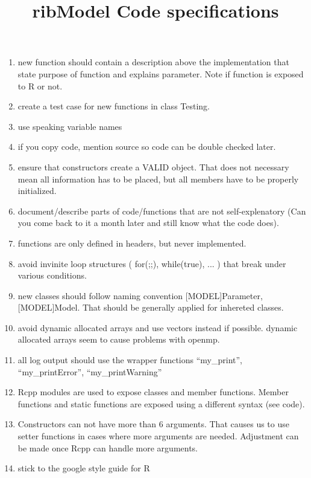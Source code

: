 \documentclass[letter,10pt]{article}
\title{ribModel Code specifications}
\begin{document}
\maketitle


\begin{enumerate}
 \item new function should contain a description above the implementation that state purpose of function and explains parameter. Note if function is exposed to R or not.
 \item create a test case for new functions in class Testing.
 \item use speaking variable names
 \item if you copy code, mention source so code can be double checked later.
 \item ensure that constructors create a VALID object. That does not necessary mean all information has to be placed, but all members have to be properly initialized. 
 \item document/describe parts of code/functions that are not self-explenatory (Can you come back to it a month later and still know what the code does).
 \item functions are only defined in headers, but never implemented.
 \item avoid invinite loop structures ( for(;;), while(true), ... ) that break under various conditions.
 \item new classes should follow naming convention [MODEL]Parameter, [MODEL]Model. That should be generally applied for inhereted classes.
 \item avoid dynamic allocated arrays and use vectors instead if possible. dynamic allocated arrays seem to cause problems with openmp.
 \item all log output should use the wrapper functions ``my\_print'', ``my\_printError'', ``my\_printWarning''
 \item Rcpp modules are used to expose classes and member functions. Member functions and static functions are exposed using a different syntax (see code). 
 \item Constructors can not have more than 6 arguments. That causes us to use setter functions in cases where more arguments are needed. Adjustment can be made once Rcpp can handle more arguments.
 \item stick to the google style guide for R
\end{enumerate}
\end{document}
